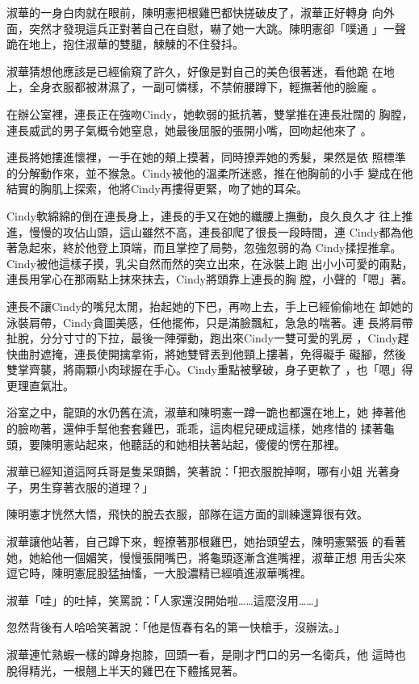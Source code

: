 淑華的一身白肉就在眼前，陳明憲把根雞巴都快搓破皮了，淑華正好轉身
向外面，突然才發現這兵正對著自己在自慰，嚇了她一大跳。陳明憲卻「噗通
」一聲跪在地上，抱住淑華的雙腿，觫觫的不住發抖。

淑華猜想他應該是已經偷窺了許久，好像是對自己的美色很著迷，看他跪
在地上，全身衣服都被淋濕了，一副可憐樣，不禁俯腰蹲下，輕撫著他的臉龐
。

在辦公室裡，連長正在強吻Cindy，她軟弱的抵抗著，雙掌推在連長壯闊的
胸膛，連長威武的男子氣概令她窒息，她最後屈服的張開小嘴，回吻起他來了
。

連長將她摟進懷裡，一手在她的頰上摸著，同時撩弄她的秀髮，果然是依
照標準的分解動作來，並不猴急。Cindy被他的溫柔所迷惑，推在他胸前的小手
變成在他結實的胸肌上探索，他將Cindy再摟得更緊，吻了她的耳朵。

Cindy軟綿綿的倒在連長身上，連長的手又在她的纖腰上撫動，良久良久才
往上推進，慢慢的攻佔山頭，這山雖然不高，連長卻爬了很長一段時間，連
Cindy都為他著急起來，終於他登上頂端，而且掌控了局勢，忽強忽弱的為
Cindy揉捏推拿。Cindy被他這樣子摸，乳尖自然而然的突立出來，在泳裝上跑
出小小可愛的兩點，連長用掌心在那兩點上抹來抹去，Cindy將頭靠上連長的胸
膛，小聲的「嗯」著。

連長不讓Cindy的嘴兒太閒，抬起她的下巴，再吻上去，手上已經偷偷地在
卸她的泳裝肩帶，Cindy貪圖美感，任他擺佈，只是滿臉飄紅，急急的喘著。連
長將肩帶扯脫，分分寸寸的下拉，最後一陣彈動，跑出來Cindy一雙可愛的乳房
，Cindy趕快曲肘遮掩，連長使開擒拿術，將她雙臂丟到他頸上摟著，免得礙手
礙腳，然後雙掌齊襲，將兩顆小肉球握在手心。Cindy重點被擊破，身子更軟了
，也「嗯」得更理直氣壯。

浴室之中，龍頭的水仍舊在流，淑華和陳明憲一蹲一跪也都還在地上，她
捧著他的臉吻著，還伸手幫他套套雞巴，乖乖，這肉棍兒硬成這樣，她疼惜的
揉著龜頭，要陳明憲站起來，他聽話的和她相扶著站起，傻傻的愣在那裡。

淑華已經知道這阿兵哥是隻呆頭鵝，笑著說：「把衣服脫掉啊，哪有小姐
光著身子，男生穿著衣服的道理？」

陳明憲才恍然大悟，飛快的脫去衣服，部隊在這方面的訓練還算很有效。

淑華讓他站著，自己蹲下來，輕撩著那根雞巴，她抬頭望去，陳明憲緊張
的看著她，她給他一個媚笑，慢慢張開嘴巴，將龜頭逐漸含進嘴裡，淑華正想
用舌尖來逗它時，陳明憲屁股猛抽慉，一大股濃精已經噴進淑華嘴裡。

淑華「哇」的吐掉，笑罵說：「人家還沒開始啦……這麼沒用……」

忽然背後有人哈哈笑著說：「他是恆春有名的第一快槍手，沒辦法。」

淑華連忙熟蝦一樣的蹲身抱膝，回頭一看，是剛才門口的另一名衛兵，他
這時也脫得精光，一根翹上半天的雞巴在下體搖晃著。

